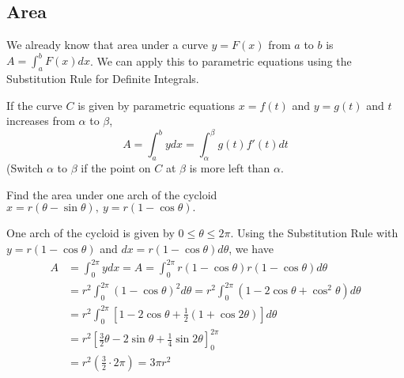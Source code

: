   \subsection*{Area}
    We already know that area under a curve $y=F(x)$ from $a$ to $b$ is $A=\int_{a}^{b} F(x)dx$. We can apply this to parametric equations using the Substitution Rule for Definite Integrals.
    \begin{definition}
      If the curve $C$ is given by parametric equations $x=f(t)$ and $y=g(t)$ and $t$ increases from $\alpha$ to $\beta$,
        $$ A=\int_{a}^{b} ydx = \int_{\alpha}^{\beta} g(t)f'(t)dt $$
      (Switch $\alpha$ to $\beta$ if the point on $C$ at $\beta$ is more left than $\alpha$.
    \end{definition}
    \begin{example}
      Find the area under one arch of the cycloid ${x=r(\theta-\sin\theta),\ y=r(1-\cos\theta)}.$
    \end{example}
    \begin{solution}
      One arch of the cycloid is given by $0 \leq \theta \leq 2\pi$. Using the Substitution Rule with $y=r(1-\cos\theta)$ and $dx=r(1-\cos\theta)d\theta$, we have
      \begin{align*}
        A &= \int_{0}^{2\pi} ydx = A=\int_{0}^{2\pi} r(1-\cos\theta)r(1-\cos\theta)d\theta \\
          &= r^2 \int_{0}^{2\pi} (1-\cos\theta)^2 d\theta = r^2 \int_{0}^{2\pi} (1 - 2 \cos\theta + \cos^2 \theta) d\theta \\
          &= r^2 \int_{0}^{2\pi} \left[1 - 2 \cos\theta + \frac{1}{2}(1+\cos 2\theta)\right] d\theta \\
          &= r^2 \left[ \frac{3}{2}\theta - 2 \sin\theta + \frac{1}{4}\sin2\theta \right]_{0}^{2\pi} \\
          &= r^2 \left( \frac{3}{2} \cdot 2\pi \right) = 3\pi r^2
      \end{align*}
    \end{solution}

